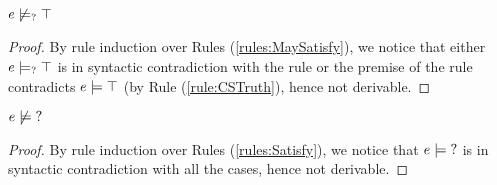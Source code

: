 \begin{lemma}
  \label{lem:no-e-may-satisfy-truth}
  $e \not\models_{?} \top$
\end{lemma}
\begin{proof}
  By rule induction over Rules (\ref{rules:MaySatisfy}), we notice that either $e \models_{?} \top$ is in syntactic contradiction with the rule or the premise of the rule contradicts $e \models \top$ (by Rule (\ref{rule:CSTruth}), hence not derivable.
\end{proof}

\begin{lemma}
  \label{lem:no-e-satisfy-unknown}
  $e \not\models \mathtt{?}$
\end{lemma}
\begin{proof}
  By rule induction over Rules (\ref{rules:Satisfy}), we notice that $e \models \mathtt{?}$ is in syntactic contradiction with all the cases, hence not derivable.
\end{proof}

